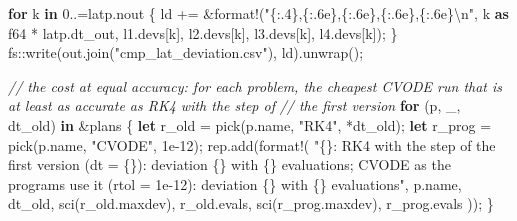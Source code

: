 \documentclass[
  10pt,
]{article}
\newenvironment{Shaded}{}{}
\newcommand{\CommentTok}[1]{\textcolor[rgb]{0.38,0.63,0.69}{\textit{#1}}}
\newcommand{\ControlFlowTok}[1]{\textcolor[rgb]{0.00,0.44,0.13}{\textbf{#1}}}
\newcommand{\DataTypeTok}[1]{\textcolor[rgb]{0.56,0.13,0.00}{#1}}
\newcommand{\DecValTok}[1]{\textcolor[rgb]{0.25,0.63,0.44}{#1}}
\newcommand{\KeywordTok}[1]{\textcolor[rgb]{0.00,0.44,0.13}{\textbf{#1}}}
\newcommand{\NormalTok}[1]{#1}
\newcommand{\OperatorTok}[1]{\textcolor[rgb]{0.40,0.40,0.40}{#1}}
\newcommand{\PreprocessorTok}[1]{\textcolor[rgb]{0.74,0.48,0.00}{#1}}
\newcommand{\SpecialCharTok}[1]{\textcolor[rgb]{0.25,0.44,0.63}{#1}}
\newcommand{\StringTok}[1]{\textcolor[rgb]{0.25,0.44,0.63}{#1}}
\begin{document}
\begin{Shaded}
\begin{Highlighting}[]
    \ControlFlowTok{for}\NormalTok{ k }\KeywordTok{in} \DecValTok{0}\OperatorTok{..=}\NormalTok{latp}\OperatorTok{.}\NormalTok{nout }\OperatorTok{\{}
\NormalTok{        ld }\OperatorTok{+=} \OperatorTok{\&}\PreprocessorTok{format!}\NormalTok{(}\StringTok{"\{:.4\},\{:.6e\},\{:.6e\},\{:.6e\},\{:.6e\}}\SpecialCharTok{\textbackslash{}n}\StringTok{"}\OperatorTok{,}\NormalTok{ k }\KeywordTok{as} \DataTypeTok{f64} \OperatorTok{*}\NormalTok{ latp}\OperatorTok{.}\NormalTok{dt\_out}\OperatorTok{,}\NormalTok{ l1}\OperatorTok{.}\NormalTok{devs[k]}\OperatorTok{,}\NormalTok{ l2}\OperatorTok{.}\NormalTok{devs[k]}\OperatorTok{,}\NormalTok{ l3}\OperatorTok{.}\NormalTok{devs[k]}\OperatorTok{,}\NormalTok{ l4}\OperatorTok{.}\NormalTok{devs[k])}\OperatorTok{;}
    \OperatorTok{\}}
    \PreprocessorTok{fs::}\NormalTok{write(out}\OperatorTok{.}\NormalTok{join(}\StringTok{"cmp\_lat\_deviation.csv"}\NormalTok{)}\OperatorTok{,}\NormalTok{ ld)}\OperatorTok{.}\NormalTok{unwrap()}\OperatorTok{;}

    \CommentTok{// the cost at equal accuracy: for each problem, the cheapest CVODE run that is at least as accurate as RK4 with the step of}
    \CommentTok{// the first version}
    \ControlFlowTok{for}\NormalTok{ (p}\OperatorTok{,}\NormalTok{ \_}\OperatorTok{,}\NormalTok{ dt\_old) }\KeywordTok{in} \OperatorTok{\&}\NormalTok{plans }\OperatorTok{\{}
        \KeywordTok{let}\NormalTok{ r\_old }\OperatorTok{=}\NormalTok{ pick(p}\OperatorTok{.}\NormalTok{name}\OperatorTok{,} \StringTok{"RK4"}\OperatorTok{,} \OperatorTok{*}\NormalTok{dt\_old)}\OperatorTok{;}
        \KeywordTok{let}\NormalTok{ r\_prog }\OperatorTok{=}\NormalTok{ pick(p}\OperatorTok{.}\NormalTok{name}\OperatorTok{,} \StringTok{"CVODE"}\OperatorTok{,} \DecValTok{1e{-}12}\NormalTok{)}\OperatorTok{;}
\NormalTok{        rep}\OperatorTok{.}\NormalTok{add(}\PreprocessorTok{format!}\NormalTok{(}
            \StringTok{"\{\}: RK4 with the step of the first version (dt = \{\}): deviation \{\} with \{\} evaluations; CVODE as the programs use it (rtol = 1e{-}12): deviation \{\} with \{\} evaluations"}\OperatorTok{,}
\NormalTok{            p}\OperatorTok{.}\NormalTok{name}\OperatorTok{,}\NormalTok{ dt\_old}\OperatorTok{,}\NormalTok{ sci(r\_old}\OperatorTok{.}\NormalTok{maxdev)}\OperatorTok{,}\NormalTok{ r\_old}\OperatorTok{.}\NormalTok{evals}\OperatorTok{,}\NormalTok{ sci(r\_prog}\OperatorTok{.}\NormalTok{maxdev)}\OperatorTok{,}\NormalTok{ r\_prog}\OperatorTok{.}\NormalTok{evals}
\NormalTok{        ))}\OperatorTok{;}
    \OperatorTok{\}}


\end{Highlighting}
\end{Shaded}
\end{document}
